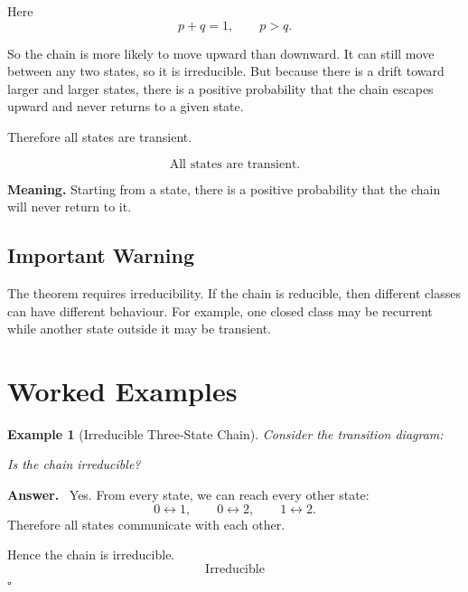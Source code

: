\documentclass[12pt,a4paper]{article}
\theoremstyle{notestyle}
\newtheorem{example}{Example}
\newenvironment{answer}
{\par\textbf{Answer.}\ }
{\hfill$\square$\par}
\begin{document}
Here
\[
p+q=1,
\qquad
p>q.
\]

So the chain is more likely to move upward than downward. It can still move between any two states, so it is irreducible. But because there is a drift toward larger and larger states, there is a positive probability that the chain escapes upward and never returns to a given state.

Therefore all states are transient.

\[
\boxed{\text{All states are transient.}}
\]

\textbf{Meaning.} Starting from a state, there is a positive probability that the chain will never return to it.

\subsection{Important Warning}

The theorem requires irreducibility. If the chain is reducible, then different classes can have different behaviour. For example, one closed class may be recurrent while another state outside it may be transient.

\section{Worked Examples}

\begin{example}[Irreducible Three-State Chain]
Consider the transition diagram:

\begin{center}
\end{center}

Is the chain irreducible?
\end{example}

\begin{answer}
Yes. From every state, we can reach every other state:
\[
0\leftrightarrow 1,\qquad 0\leftrightarrow 2,\qquad 1\leftrightarrow 2.
\]
Therefore all states communicate with each other.

Hence the chain is irreducible.
\[
\boxed{\text{Irreducible}}
\]
\end{answer}
\end{document}
